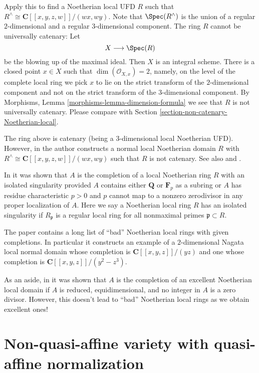 \medskip\noindent
Apply this to find a Noetherian local UFD $R$ such that
$R^\wedge \cong \mathbf{C}[[x, y, z, w]]/(wx, wy)$.
Note that $\Spec(R^\wedge)$ is the
union of a regular $2$-dimensional and a regular $3$-dimensional component.
The ring $R$ cannot be universally catenary: Let
$$
X \longrightarrow \Spec(R)
$$
be the blowing up of the maximal ideal. Then $X$ is an integral scheme.
There is a closed point $x \in X$ such that $\dim(\mathcal{O}_{X, x}) = 2$,
namely, on the level of the complete local ring we pick $x$ to lie on the
strict transform of the $2$-dimensional component and not on the strict
transform of the $3$-dimensional component. By
Morphisms, Lemma \ref{morphisms-lemma-dimension-formula}
we see that $R$ is not universally catenary. Please compare with
Section \ref{section-non-catenary-Noetherian-local}.

\medskip\noindent
The ring above is catenary (being a $3$-dimensional local Noetherian UFD).
However, in \cite{Ogoma-example} the author constructs a normal local
Noetherian domain $R$ with $R^\wedge \cong \mathbf{C}[[x, y, z, w]]/(wx, wy)$
such that $R$ is not catenary. See also \cite{Heitmann-Ogoma} and
\cite{Lech-YAPO}.

\medskip\noindent
In \cite{Heitmann-isolated} it was shown that $A$ is the completion
of a local Noetherian ring $R$ with an isolated singularity
provided $A$ contains either $\mathbf{Q}$ or $\mathbf{F}_p$ as a subring
or $A$ has residue characteristic $p > 0$ and $p$ cannot map to a
nonzero zerodivisor in any proper localization of $A$.
Here we say a Noetherian local ring $R$
has an isolated singularity if $R_\mathfrak p$ is
a regular local ring for all nonmaximal primes $\mathfrak p \subset R$.

\medskip\noindent
The paper \cite{Nishimura-few} contains a long list of ``bad'' Noetherian
local rings with given completions. In particular it constructs
an example of a $2$-dimensional Nagata local normal domain whose
completion is $\mathbf{C}[[x, y, z]]/(yz)$ and one whose completion
is $\mathbf{C}[[x, y, z]]/(y^2 - z^3)$.

\medskip\noindent
As an aside, in \cite{Loepp} it was shown that $A$ is the completion of an
excellent Noetherian local domain if $A$ is reduced, equidimensional,
and no integer in $A$ is a zero divisor. However, this doesn't lead
to ``bad'' Noetherian local rings as we obtain excellent ones!





\section{Non-quasi-affine variety with quasi-affine normalization}
\label{section-nonquasi-affine}

